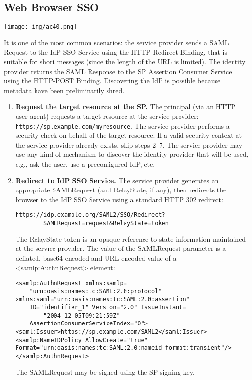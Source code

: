 \documentclass[a4paper, 10pt, titlepage]{article}
\begin{document}
\subsection*{Web Browser SSO}
\begin{center}
\texttt{[image: img/ac40.png]}
\end{center}
It is one of the most common scenarios: the service provider sends a SAML Request to the IdP SSO Service using the HTTP-Redirect Binding, that is suitable for short messages (since the length of the URL is limited). The identity provider returns the SAML Response to the SP Assertion Consumer Service using the HTTP-POST Binding. Discovering the IdP is possible because metadata have been preliminarily shred.
\begin{enumerate}
\item \textbf{Request the target resource at the SP.} The principal (via an HTTP user agent) requests a target resource at the service provider: \lstinline|https://sp.example.com/myresource|.
The service provider performs a security check on behalf of the target resource. If a valid security context at the service provider already exists, skip steps 2–7. The service provider may use any kind of mechanism to discover the identity provider that will be used, e.g., ask the user, use a preconfigured IdP, etc.
\item \textbf{Redirect to IdP SSO Service.} The service provider generates an appropriate SAMLRequest (and RelayState, if any), then redirects the browser to the IdP SSO Service using a standard HTTP 302 redirect: 
\begin{lstlisting}
https://idp.example.org/SAML2/SSO/Redirect?			
		SAMLRequest=request&RelayState=token
\end{lstlisting}
The RelayState token is an opaque reference to state information maintained at the service provider. The value of the SAMLRequest parameter is a deflated, base64-encoded and URL-encoded value of a <samlp:AuthnRequest> element:
\begin{lstlisting}
<samlp:AuthnRequest xmlns:samlp=
	"urn:oasis:names:tc:SAML:2.0:protocol"
xmlns:saml="urn:oasis:names:tc:SAML:2.0:assertion" 
	ID="identifier_1" Version="2.0" IssueInstant=
		"2004-12-05T09:21:59Z" 
	AssertionConsumerServiceIndex="0">
<saml:Issuer>https://sp.example.com/SAML2</saml:Issuer>
<samlp:NameIDPolicy AllowCreate="true"
Format="urn:oasis:names:tc:SAML:2.0:nameid-format:transient"/> 
</samlp:AuthnRequest>
\end{lstlisting}
The SAMLRequest may be signed using the SP signing key.

\end{enumerate}
\end{document}
